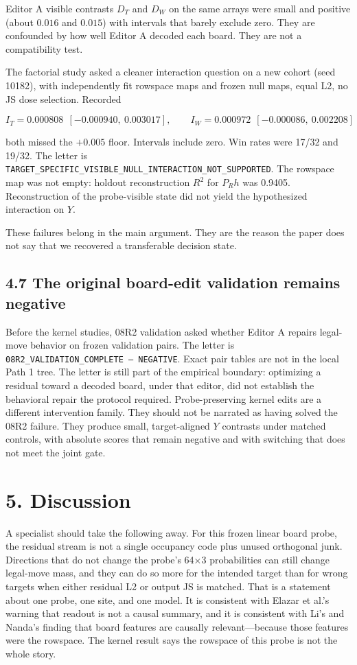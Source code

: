 \documentclass[11pt]{article}
\begin{document}
Editor A visible contrasts \(D_T\) and \(D_W\) on the same arrays were small and positive (about \(0.016\) and \(0.015\)) with intervals that barely exclude zero. They are confounded by how well Editor A decoded each board. They are not a compatibility test.

The factorial study asked a cleaner interaction question on a new cohort (seed 10182), with independently fit rowspace maps and frozen null maps, equal L2, no JS dose selection. Recorded

\[
I_T=0.000808\ \ [-0.000940,\ 0.003017],\qquad
I_W=0.000972\ \ [-0.000086,\ 0.002208]
\]

both missed the \(+0.005\) floor. Intervals include zero. Win rates were 17/32 and 19/32. The letter is \texttt{TARGET\_SPECIFIC\_VISIBLE\_NULL\_INTERACTION\_NOT\_SUPPORTED}. The rowspace map was not empty: holdout reconstruction \(R^2\) for \(P_R h\) was 0.9405. Reconstruction of the probe-visible state did not yield the hypothesized interaction on \(Y\).

These failures belong in the main argument. They are the reason the paper does not say that we recovered a transferable decision state.

\subsection{4.7 The original board-edit validation remains negative}

Before the kernel studies, 08R2 validation asked whether Editor A repairs legal-move behavior on frozen validation pairs. The letter is \texttt{08R2\_VALIDATION\_COMPLETE --- NEGATIVE}. Exact pair tables are not in the local Path 1 tree. The letter is still part of the empirical boundary: optimizing a residual toward a decoded board, under that editor, did not establish the behavioral repair the protocol required. Probe-preserving kernel edits are a different intervention family. They should not be narrated as having solved the 08R2 failure. They produce small, target-aligned \(Y\) contrasts under matched controls, with absolute scores that remain negative and with switching that does not meet the joint gate.

\section{5. Discussion}

A specialist should take the following away. For this frozen linear board probe, the residual stream is not a single occupancy code plus unused orthogonal junk. Directions that do not change the probe's 64×3 probabilities can still change legal-move mass, and they can do so more for the intended target than for wrong targets when either residual L2 or output JS is matched. That is a statement about one probe, one site, and one model. It is consistent with Elazar et al.'s warning that readout is not a causal summary, and it is consistent with Li's and Nanda's finding that board features are causally relevant---because those features were the rowspace. The kernel result says the rowspace of this probe is not the whole story.
\end{document}

